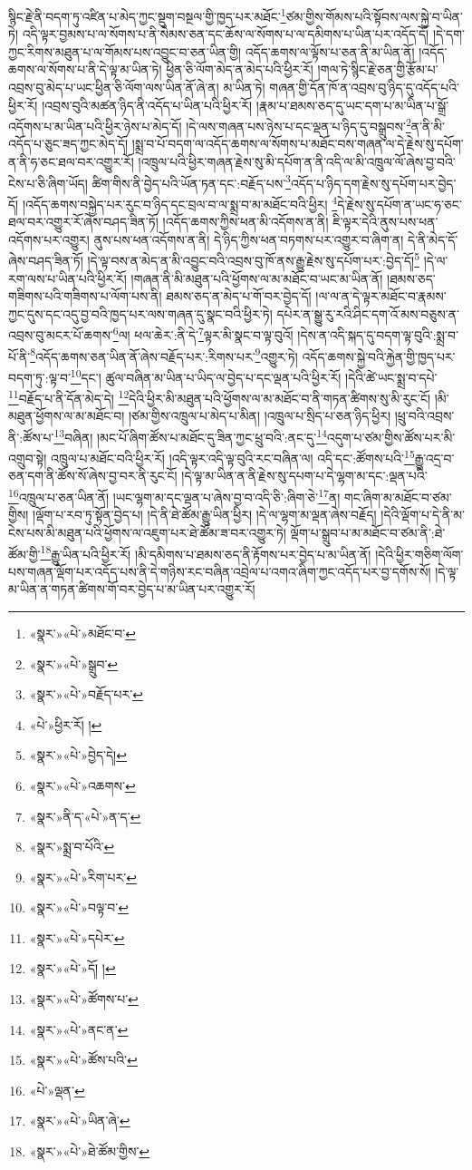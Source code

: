 སྙིང་རྗེ་ནི་བདག་ཏུ་འཛིན་པ་མེད་ཀྱང་སྡུག་བསྔལ་གྱི་ཁྱད་པར་མཐོང་\footnote{«སྣར་»«པེ་»མཐོང་བ་}ཙམ་གྱིས་གོམས་པའི་སྟོབས་ལས་སྐྱེ་བ་ཡིན་ཏེ། འདི་ལྟར་བྱམས་པ་ལ་སོགས་པ་ནི་སེམས་ཅན་དང་ཆོས་ལ་སོགས་པ་ལ་དམིགས་པ་ཡིན་པར་འདོད་དོ། །དེ་དག་ཀྱང་རིགས་མཐུན་པ་ལ་གོམས་པས་འབྱུང་བ་ཅན་ཡིན་གྱི། འདོད་ཆགས་ལ་ལྟོས་པ་ཅན་ནི་མ་ཡིན་ནོ། །འདོད་ཆགས་ལ་སོགས་པ་ནི་དེ་ལྟ་མ་ཡིན་ཏེ། ཕྱིན་ཅི་ལོག་མེད་ན་མེད་པའི་ཕྱིར་རོ། །གལ་ཏེ་སྙིང་རྗེ་ཅན་གྱི་རྩོམ་པ་འབྲས་བུ་མེད་པ་ཡང་ཕྱིན་ཅི་ལོག་ལས་ཡིན་ནོ་ཞེ་ན། མ་ཡིན་ཏེ། གཞན་གྱི་དོན་ཁོ་ན་འབྲས་བུ་ཉིད་དུ་འདོད་པའི་ཕྱིར་རོ། །འབྲས་བུའི་མཚན་ཉིད་ནི་འདོད་པ་ཡིན་པའི་ཕྱིར་རོ། །རྣམ་པ་ཐམས་ཅད་དུ་ཡང་དག་པ་མ་ཡིན་པ་སྒྲོ་འདོགས་པ་མ་ཡིན་པའི་ཕྱིར་ཉེས་པ་མེད་དོ། །དེ་ལས་གཞན་པས་ཉེས་པ་དང་ལྡན་པ་ཉིད་དུ་བསྒྲུབས་\footnote{«སྣར་»«པེ་»སྒྲུབ་}ན་ནི་མི་འདོད་པ་ཅུང་ཟད་ཀྱང་མེད་དོ། །སྨྲ་བ་པོ་བདག་ལ་འདོད་ཆགས་ལ་སོགས་པ་མཐོང་བས་གཞན་ལ་དེ་རྗེས་སུ་དཔོག་ན་ནི་ཧ་ཅང་ཐལ་བར་འགྱུར་རོ། །འཁྲུལ་པའི་ཕྱིར་གཞན་རྗེས་སུ་མི་དཔོག་ན་ནི་འདི་ལ་མི་འཁྲུལ་ལོ་ཞེས་བྱ་བའི་ངེས་པ་ཅི་ཞིག་ཡོད། ཚིག་གིས་ནི་བྱེད་པའི་ཡོན་ཏན་དང་:བརྗོད་པས་\footnote{«སྣར་»«པེ་»བརྗོད་པར་}འདོད་པ་ཉིད་དག་རྗེས་སུ་དཔོག་པར་བྱེད་དོ། །འདོད་ཆགས་བསྐྱེད་པར་རུང་བ་ཉིད་དང་བྲལ་བ་ལ་སྨྲ་བ་མ་མཐོང་བའི་ཕྱིར། \footnote{«པེ་»ཕྱིར་རོ། ། }དེ་རྗེས་སུ་དཔོག་ན་ཡང་ཧ་ཅང་ཐལ་བར་འགྱུར་རོ་ཞེས་བཤད་ཟིན་ཏོ། །འདོད་ཆགས་ཀྱིས་ཕན་མི་འདོགས་ན་ནི། ཇི་ལྟར་དེའི་ནུས་པས་ཕན་འདོགས་པར་འགྱུར། ནུས་པས་ཕན་འདོགས་ན་ནི། དེ་ཉིད་ཀྱིས་ཕན་བཏགས་པར་འགྱུར་བ་ཞིག་ན། དེ་ནི་མེད་དོ་ཞེས་བཤད་ཟིན་ཏོ། །དེ་ལྟ་བས་ན་མེད་ན་མི་འབྱུང་བའི་འབྲས་བུ་ཁོ་ནས་རྒྱུ་རྗེས་སུ་དཔོག་པར་:བྱེད་དོ།\footnote{«སྣར་»«པེ་»བྱེད་དེ།} །དེ་ལ་རག་ལས་པ་ཡིན་པའི་ཕྱིར་རོ། །གཞན་ནི་མི་མཐུན་པའི་ཕྱོགས་ལ་མ་མཐོང་བ་ཡང་མ་ཡིན་ནོ། །ཐམས་ཅད་གཟིགས་པའི་གཟིགས་པ་ལོག་པས་ནི། ཐམས་ཅད་ན་མེད་པ་གོ་བར་བྱེད་དོ། །ལ་ལ་ན་དེ་ལྟར་མཐོང་བ་རྣམས་ཀྱང་དུས་དང་འདུ་བྱ་བའི་ཁྱད་པར་ལས་གཞན་དུ་སྣང་བའི་ཕྱིར་ཏེ། དཔེར་ན་སྒྱུ་རུ་རའི་ཤིང་དག་འོ་མས་བཅུས་ན་འབྲས་བུ་མངར་པོ་ཆགས་\footnote{«སྣར་»«པེ་»འཆགས་}ལ། ཕལ་ཆེར་:ནི་དེ་\footnote{«སྣར་»ནི་ད་«པེ་»ན་ད་}ལྟར་མི་སྣང་བ་ལྟ་བུའོ། །དེས་ན་འདི་སྐད་དུ་བདག་ལྟ་བུའི་:སྨྲ་བ་པོ་ནི་\footnote{«སྣར་»སྨྲ་བ་པོའི་}འདོད་ཆགས་ཅན་ཡིན་ནོ་ཞེས་བརྗོད་པར་:རིགས་པར་\footnote{«སྣར་»«པེ་»རིག་པར་}འགྱུར་ཏེ། འདོད་ཆགས་སྐྱེ་བའི་རྐྱེན་གྱི་ཁྱད་པར་བདག་ཏུ་:ལྟ་བ་\footnote{«སྣར་»«པེ་»བལྟ་བ་}དང་། ཚུལ་བཞིན་མ་ཡིན་པ་ཡིད་ལ་བྱེད་པ་དང་ལྡན་པའི་ཕྱིར་རོ། །དེའི་ཚེ་ཡང་སྨྲ་བ་དཔེ་\footnote{«སྣར་»«པེ་»དཔེར་}བརྗོད་པ་ནི་དོན་མེད་དེ། \footnote{«སྣར་»«པེ་»དོ། ། }དེའི་ཕྱིར་མི་མཐུན་པའི་ཕྱོགས་ལ་མ་མཐོང་བ་ནི་གཏན་ཚིགས་སུ་མི་རུང་ངོ། །མི་མཐུན་ཕྱོགས་ལ་མ་མཐོང་བ། །ཙམ་གྱིས་འཁྲུལ་པ་མེད་པ་མིན། །འཁྲུལ་པ་སྲིད་པ་ཅན་ཉིད་ཕྱིར། །ཕྲུ་བའི་འབྲས་ནི་:ཚོས་པ་\footnote{«སྣར་»«པེ་»ཚོགས་པ་}བཞིན། །མང་པོ་ཞིག་ཚོས་པ་མཐོང་དུ་ཟིན་ཀྱང་ཕྲུ་བའི་:ནང་དུ་\footnote{«སྣར་»«པེ་»ནང་ན་}འདུག་པ་ཙམ་གྱིས་ཚོས་པར་མི་འགྲུབ་སྟེ། འཁྲུལ་པ་མཐོང་བའི་ཕྱིར་རོ། །འདི་ལྟར་འདི་ལྟ་བུའི་རང་བཞིན་ལ། འདི་དང་:ཚོགས་པའི་\footnote{«སྣར་»«པེ་»ཚོས་པའི་}རྒྱུ་འདྲ་བ་ཅན་དག་ནི་ཚོས་སོ་ཞེས་བྱ་བར་ནི་རུང་ངོ། །དེ་ལྟ་མ་ཡིན་ན་ནི་རྗེས་སུ་དཔག་པ་དེ་ལྷག་མ་དང་:ལྡན་པའི་\footnote{«པེ་»ལྡན་}འཁྲུལ་པ་ཅན་ཡིན་ནོ། །ཡང་ལྷག་མ་དང་ལྡན་པ་ཞེས་བྱ་བ་འདི་ཅི་:ཞིག་ཅེ་\footnote{«སྣར་»«པེ་»ཡིན་ཞེ་}ན། གང་ཞིག་མ་མཐོང་བ་ཙམ་གྱིས། །ལྡོག་པ་རབ་ཏུ་སྟོན་བྱེད་པ། །དེ་ནི་ཐེ་ཚོམ་རྒྱུ་ཡིན་ཕྱིར། །དེ་ལ་ལྷག་མ་ལྡན་ཞེས་བརྗོད། །དེའི་ལྡོག་པ་དེ་ནི་མ་ངེས་པས་མི་མཐུན་པའི་ཕྱོགས་ལ་འཇུག་པར་ཐེ་ཚོམ་ཟ་བར་འགྱུར་ཏེ། ལྡོག་པ་སྒྲུབ་པ་མ་མཐོང་བ་ཙམ་ནི་:ཐེ་ཚོམ་གྱི་\footnote{«སྣར་»«པེ་»ཐེ་ཚོམ་གྱིས་}རྒྱུ་ཡིན་པའི་ཕྱིར་རོ། །མི་དམིགས་པ་ཐམས་ཅད་ནི་རྟོགས་པར་བྱེད་པ་མ་ཡིན་ནོ། །དེའི་ཕྱིར་གཅིག་ལོག་པས་གཞན་ལྡོག་པར་འདོད་པས་ནི་དེ་གཉིས་རང་བཞིན་འབྲེལ་པ་འགའ་ཞིག་ཀྱང་འདོད་པར་བྱ་དགོས་སོ། །དེ་ལྟ་མ་ཡིན་ན་གཏན་ཚིགས་གོ་བར་བྱེད་པ་མ་ཡིན་པར་འགྱུར་རོ། 